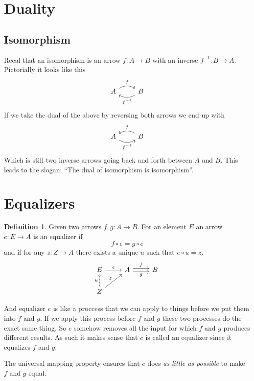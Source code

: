 \documentclass{book}
\theoremstyle{definition}
\newtheorem{definition}{Definition}[section]
\begin{document}
\section{Duality}

\subsection{Isomorphism}

Recal that an isomorphism is an arrow $f : A \to B$ with an inverse
$f^{-1} : B \to A$. Pictorially it looks like this
\[
  \begin{tikzcd}
    A \ar[r, bend left, "f"] & B \ar[l, bend left, "f^{-1}"]
  \end{tikzcd}
\]
If we take the dual of the above by reversing both arrows we end up with
\[
  \begin{tikzcd}
    A \ar[r, bend right, "f^{-1}"'] & B \ar[l, bend right, "f"']
  \end{tikzcd}
\]
Which is still two inverse arrows going back and forth between $A$ and $B$. This
leads to the slogan: ``The dual of isomorphism is isomorphism''.

\section{Equalizers}

\begin{definition}
  Given two arrows $f, g : A \to B$. For an element $E$ an arrow $e : E \to A$ is an
  equalizer if
  \[
    f \circ e = g \circ e
  \]
  and if for any $z : Z \to A$ there exists a unique $u$ such that $e \circ u = z$.
  \[
    \begin{tikzcd}
      E \ar[r, "e"] & A \ar[r, shift left, "f"] \ar[r, shift right, "g"'] & B \\
      Z \ar[u, dashrightarrow, "u"] \ar[ur, "z"]
    \end{tikzcd}
  \]
\end{definition}

And equalizer $e$ is like a proccess that we can apply to things before we put
them into $f$ and $g$. If we apply this process before $f$ and $g$ these two
processes do the exact same thing. So $e$ somehow removes all the input for
which $f$ and $g$ produces different results. As such it makes sense that $e$ is
called an equalizer since it equalizes $f$ and $g$.

The universal mapping property ensures that $e$ does \emph{as little as
  possible} to make $f$ and $g$ equal.
\end{document}
